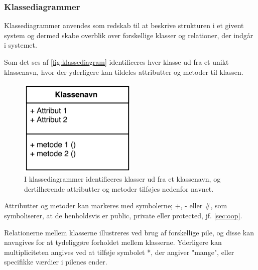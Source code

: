 
\subsubsection{Klassediagrammer}
Klassediagrammer anvendes som redskab til at beskrive strukturen i et givent system og dermed skabe overblik over forskellige klasser og relationer, der indgår i systemet. 

Som det ses af \autoref{fig:klassediagram} identificeres hver klasse ud fra et unikt klassenavn, hvor der yderligere kan tildeles attributter og metoder til klassen.

\begin{figure} [H]
\centering
\includegraphics[width=0.5\textwidth]{figures/klassediag}
\caption{I klassediagrammer identificeres klasser ud fra et klassenavn, og dertilhørende attributter og metoder tilføjes nedenfor navnet.}
\label{fig:klassediagram}
\end{figure}

Attributter og metoder kan markeres med symbolerne; +, - eller #, som symboliserer, at de henholdsvis er public, private eller protected, jf. \autoref{sec:oop}.

Relationerne mellem klasserne illustreres ved brug af forskellige pile, og disse kan navngives for at tydeliggøre forholdet mellem  klasserne. Yderligere kan multipliciteten angives ved at tilføje symbolet *, der angiver "mange", eller specifikke værdier i pilenes ender. 















